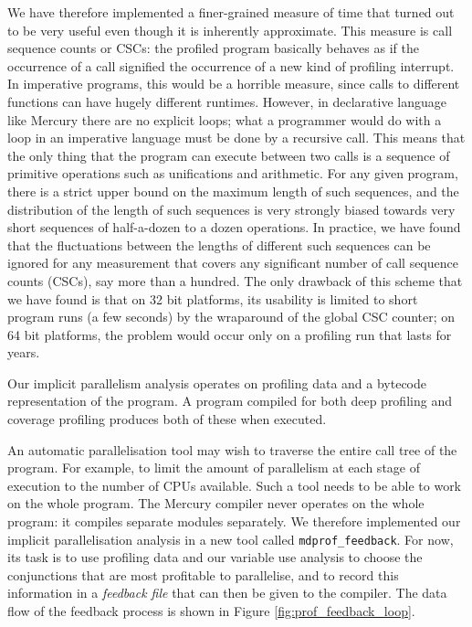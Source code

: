 We have therefore implemented a finer-grained measure of time
that turned out to be very useful
even though it is inherently approximate.
This measure is call sequence counts or CSCs:
the profiled program basically behaves
as if the occurrence of a call signified
the occurrence of a new kind of profiling interrupt.
In imperative programs, this would be a horrible measure,
since calls to different functions can have hugely different runtimes.
However, in declarative language like Mercury there are no explicit loops;
what a programmer would do with a loop in an imperative language
must be done by a recursive call.
This means that the only thing that the program can execute between two calls
is a sequence of primitive operations such as unifications and arithmetic.
For any given program,
there is a strict upper bound on the maximum length of such sequences,
and the distribution of the length of such sequences
is very strongly biased towards very short sequences
of half-a-dozen to a dozen operations.
In practice, we have found that
the fluctuations between the lengths of different such sequences
can be ignored for any measurement
that covers any significant number of call sequence counts (CSCs),
say more than a hundred.
The only drawback of this scheme that we have found
is that on 32 bit platforms,
its usability is limited to short program runs (a few seconds)
by the wraparound of the global CSC counter;
on 64 bit platforms, the problem would occur
only on a profiling run that lasts for years.



Our implicit parallelism analysis operates on profiling data and a
bytecode representation of the program.
A program compiled for both deep profiling and coverage profiling
produces both of these when executed.

An automatic parallelisation tool
may wish to traverse the entire call tree of the program.
For example, to limit the amount of parallelism at each stage of execution
to the number of CPUs available.
Such a tool needs to be able to work on the whole program.
The Mercury compiler never operates on the whole program:
it compiles separate modules separately.
We therefore implemented our implicit parallelisation analysis in a new tool called
\texttt{mdprof\_feedback}.
For now, its task is to use profiling data and our variable use analysis
to choose the conjunctions that are most profitable to parallelise,
and to record this information in a \emph{feedback file}
that can then be given to the compiler.
The data flow of the feedback process is shown in Figure
\ref{fig:prof_feedback_loop}.

